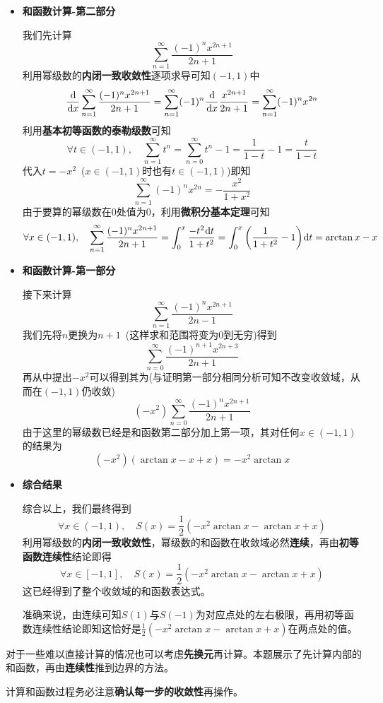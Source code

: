 \documentclass[a4paper,UTF8,fontset=windows,AutoFakeBold]{ctexart}
\newcommand*{\dr}{\hspace{0.07em}\mathrm{d}}
\newcommand*{\suminf}[1][n=1]{\sum_{#1}^\infty}
\newcommand*{\note}{\noindent *}
\theoremstyle{ex}
\begin{document}
\begin{framed}
{\begin{itemize}
        \item \textbf{和函数计算-第二部分}
        
        我们先计算
        $$\suminf\frac{(-1)^nx^{2n+1}}{2n+1}$$
        利用幂级数的\textbf{内闭一致收敛性}逐项求导可知$(-1,1)$中
        $$\frac{\dr}{\dr x}\suminf\frac{(-1)^nx^{2n+1}}{2n+1}=\suminf(-1)^n\frac{\dr}{\dr x}\frac{x^{2n+1}}{2n+1}=\suminf(-1)^nx^{2n}$$
        利用\textbf{基本初等函数的泰勒级数}可知
        $$\forall t\in(-1,1),\quad\suminf t^n=\suminf[n=0]t^n-1=\frac{1}{1-t}-1=\frac{t}{1-t}$$
        代入$t=-x^2$\ ($x\in(-1,1)$时也有$t\in(-1,1)$)即知
        $$\suminf(-1)^nx^{2n}=-\frac{x^2}{1+x^2}$$
        由于要算的幂级数在0处值为0，利用\textbf{微积分基本定理}可知
        $$\forall x\in(-1,1),\quad\suminf\frac{(-1)^nx^{2n+1}}{2n+1}=\int_0^x\frac{-t^2\dr t}{1+t^2}=\int_0^x\bigg(\frac{1}{1+t^2}-1\bigg)\dr t=\arctan x-x$$

        \item \textbf{和函数计算-第一部分}
        
        接下来计算
        $$\suminf\frac{(-1)^nx^{2n+1}}{2n-1}$$
        我们先将$n$更换为$n+1$\ (这样求和范围将变为0到无穷)得到
        $$\suminf[n=0]\frac{(-1)^{n+1}x^{2n+3}}{2n+1}$$
        再从中提出$-x^2$可以得到其为(与证明第一部分相同分析可知不改变收敛域，从而在$(-1,1)$仍收敛)
        $$(-x^2)\suminf[n=0]\frac{(-1)^nx^{2n+1}}{2n+1}$$
        由于这里的幂级数已经是和函数第二部分加上第一项，其对任何$x\in(-1,1)$的结果为
        $$(-x^2)(\arctan x-x+x)=-x^2\arctan x$$

        \item \textbf{综合结果}

        综合以上，我们最终得到
        $$\forall x\in(-1,1),\quad S(x)=\frac{1}{2}(-x^2\arctan x-\arctan x+x)$$
        利用幂级数的\textbf{内闭一致收敛性}，幂级数的和函数在收敛域必然\textbf{连续}，再由\textbf{初等函数连续性}结论即得
        $$\forall x\in[-1,1],\quad S(x)=\frac{1}{2}(-x^2\arctan x-\arctan x+x)$$
        这已经得到了整个收敛域的和函数表达式。

        \note 准确来说，由连续可知$S(1)$与$S(-1)$为对应点处的左右极限，再用初等函数连续性结论即知这恰好是$\frac{1}{2}(-x^2\arctan x-\arctan x+x)$在两点处的值。
    \end{itemize}
}
\end{framed}

\note 对于一些难以直接计算的情况也可以考虑\textbf{先换元}再计算。本题展示了先计算内部的和函数，再由\textbf{连续性}推到边界的方法。

\note 计算和函数过程务必注意\textbf{确认每一步的收敛性}再操作。
\end{document}
